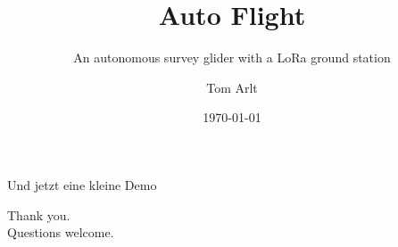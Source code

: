 \documentclass[aspectratio=169,11pt]{beamer}
\title{Auto Flight}
\subtitle{An autonomous survey glider with a LoRa ground station}
\author{Tom Arlt}
\institute{Mobile Robotics}
\date{\today}
\begin{document}
\maketitle








\begin{frame}[standout]
  Und jetzt eine kleine Demo
\end{frame}

\begin{frame}[standout]
  Thank you.\\[0.4em]
  \small\normalfont Questions welcome.
\end{frame}
\end{document}
